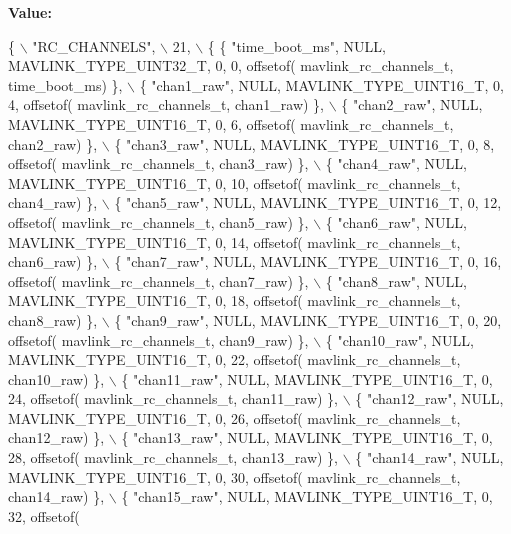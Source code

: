 {\bfseries Value\+:}
\begin{DoxyCode}
\{ \(\backslash\)
    \textcolor{stringliteral}{"RC\_CHANNELS"}, \(\backslash\)
    21, \(\backslash\)
    \{  \{ \textcolor{stringliteral}{"time\_boot\_ms"}, NULL, MAVLINK_TYPE_UINT32_T, 0, 0, offsetof(
      mavlink_rc_channels_t, time\_boot\_ms) \}, \(\backslash\)
         \{ \textcolor{stringliteral}{"chan1\_raw"}, NULL, MAVLINK_TYPE_UINT16_T, 0, 4, offsetof(
      mavlink_rc_channels_t, chan1\_raw) \}, \(\backslash\)
         \{ \textcolor{stringliteral}{"chan2\_raw"}, NULL, MAVLINK_TYPE_UINT16_T, 0, 6, offsetof(
      mavlink_rc_channels_t, chan2\_raw) \}, \(\backslash\)
         \{ \textcolor{stringliteral}{"chan3\_raw"}, NULL, MAVLINK_TYPE_UINT16_T, 0, 8, offsetof(
      mavlink_rc_channels_t, chan3\_raw) \}, \(\backslash\)
         \{ \textcolor{stringliteral}{"chan4\_raw"}, NULL, MAVLINK_TYPE_UINT16_T, 0, 10, offsetof(
      mavlink_rc_channels_t, chan4\_raw) \}, \(\backslash\)
         \{ \textcolor{stringliteral}{"chan5\_raw"}, NULL, MAVLINK_TYPE_UINT16_T, 0, 12, offsetof(
      mavlink_rc_channels_t, chan5\_raw) \}, \(\backslash\)
         \{ \textcolor{stringliteral}{"chan6\_raw"}, NULL, MAVLINK_TYPE_UINT16_T, 0, 14, offsetof(
      mavlink_rc_channels_t, chan6\_raw) \}, \(\backslash\)
         \{ \textcolor{stringliteral}{"chan7\_raw"}, NULL, MAVLINK_TYPE_UINT16_T, 0, 16, offsetof(
      mavlink_rc_channels_t, chan7\_raw) \}, \(\backslash\)
         \{ \textcolor{stringliteral}{"chan8\_raw"}, NULL, MAVLINK_TYPE_UINT16_T, 0, 18, offsetof(
      mavlink_rc_channels_t, chan8\_raw) \}, \(\backslash\)
         \{ \textcolor{stringliteral}{"chan9\_raw"}, NULL, MAVLINK_TYPE_UINT16_T, 0, 20, offsetof(
      mavlink_rc_channels_t, chan9\_raw) \}, \(\backslash\)
         \{ \textcolor{stringliteral}{"chan10\_raw"}, NULL, MAVLINK_TYPE_UINT16_T, 0, 22, offsetof(
      mavlink_rc_channels_t, chan10\_raw) \}, \(\backslash\)
         \{ \textcolor{stringliteral}{"chan11\_raw"}, NULL, MAVLINK_TYPE_UINT16_T, 0, 24, offsetof(
      mavlink_rc_channels_t, chan11\_raw) \}, \(\backslash\)
         \{ \textcolor{stringliteral}{"chan12\_raw"}, NULL, MAVLINK_TYPE_UINT16_T, 0, 26, offsetof(
      mavlink_rc_channels_t, chan12\_raw) \}, \(\backslash\)
         \{ \textcolor{stringliteral}{"chan13\_raw"}, NULL, MAVLINK_TYPE_UINT16_T, 0, 28, offsetof(
      mavlink_rc_channels_t, chan13\_raw) \}, \(\backslash\)
         \{ \textcolor{stringliteral}{"chan14\_raw"}, NULL, MAVLINK_TYPE_UINT16_T, 0, 30, offsetof(
      mavlink_rc_channels_t, chan14\_raw) \}, \(\backslash\)
         \{ \textcolor{stringliteral}{"chan15\_raw"}, NULL, MAVLINK_TYPE_UINT16_T, 0, 32, offsetof(

\end{DoxyCode}
